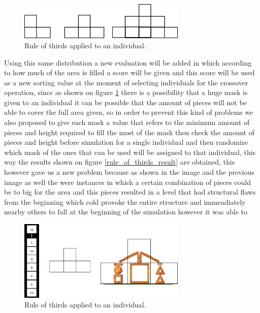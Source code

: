 \documentclass[conference]{IEEEtran}
\begin{document}
\begin{figure}[htbp]
    \centerline{\includegraphics[width=80mm]{Images/mask_distribution.png}}
    \caption{Rule of thirds applied to an individual.}
    \label{rule_of_thirds_masks}
\end{figure}

Using this same distribution a new evaluation will be added in which according
to how much of the area is filled a score will be given and this score will be
used as a new sorting value at the moment of selecting individuals for the
crossover operation, since as shown on figure \ref{rule_of_thirds_masks} there
is a possibility that a huge mask is given to an individual it can be possible
that the amount of pieces will not be able to cover the full area given, so in
order to prevent this kind of problems we also proposed to give each mask a
value that refers to the minimum amount of pieces and height required to fill
the most of the mask then check the amount of pieces and height before
simulation for a single individual and then randomize which mask of the ones
that can be used will be assigned to that individual, this way the results shown
on figure \ref{rule_of_thirds_result} are obtained, this however gave us a new
problem because as shown in the image and the previous image as well the were
instances in which a certain combination of pieces could be to big for the area
and this pieces resulted in a level that had structural flaws from the beginning
which cold provoke the entire structure and immeadiately nearby others to fall
at the beginning of the simulation however it was able to 

\begin{figure}[htbp]
    \centerline{\includegraphics[width=80mm]{Images/chromosome_thirds.png}}
    \caption{Rule of thirds applied to an individual.}
    \label{rule_of_thirds_applied}
\end{figure}
\end{document}
